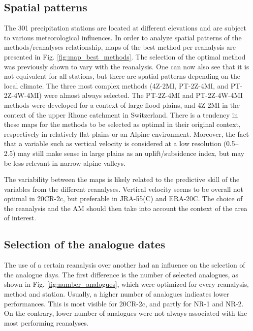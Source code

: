 \documentclass{ametsoc}
\begin{document}
\subsection{Spatial patterns}

The 301 precipitation stations are located at different elevations and are subject to various meteorological influences. In order to analyze spatial patterns of the methods/reanalyses relationship, maps of the best method per reanalysis are presented in Fig. \ref{fig:map_best_methods}. The selection of the optimal method was previously shown to vary with the reanalysis. One can now also see that it is not equivalent for all stations, but there are spatial patterns depending on the local climate. The three most complex methods (4Z-2MI, PT-2Z-4MI, and PT-2Z-4W-4MI) were almost always selected. The PT-2Z-4MI and PT-2Z-4W-4MI methods were developed for a context of large flood plains, and 4Z-2MI in the context of the upper Rhone catchment in Switzerland. There is a tendency in these maps for the methods to be selected as optimal in their original context, respectively in relatively flat plains or an Alpine environment. Moreover, the fact that a variable such as vertical velocity is considered at a low resolution (0.5\degree -- 2.5\degree) may still make sense in large plains as an uplift/subsidence index, but may be less relevant in narrow alpine valleys. 

The variability between the maps is likely related to the predictive skill of the variables from the different reanalyses. Vertical velocity seems to be overall not optimal in 20CR-2c, but preferable in JRA-55(C) and ERA-20C. The choice of the reanalysis and the AM should then take into account the context of the area of interest.


\subsection{Selection of the analogue dates}

The use of a certain reanalysis over another had an influence on the selection of the analogue days. The first difference is the number of selected analogues, as shown in Fig. \ref{fig:number_analogues}, which were optimized for every reanalysis, method and station. Usually, a higher number of analogues indicates lower performances. This is most visible for 20CR-2c, and partly for NR-1 and NR-2. On the contrary, lower number of analogues were not always associated with the most performing reanalyses.
\end{document}
